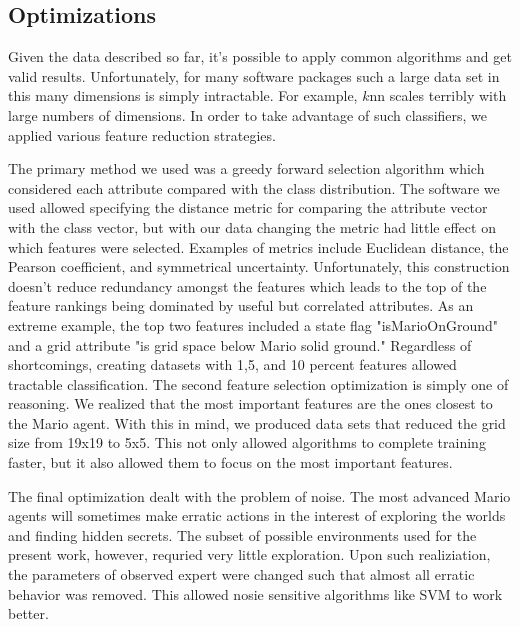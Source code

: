 \documentclass[]{article}   %
\begin{document}
\subsection{Optimizations}
Given the data described so far, it's possible to apply common algorithms and get valid results.  Unfortunately, for many software packages such a large data set in this many dimensions is simply intractable.  For example, $k$nn scales terribly with large numbers of dimensions.  In order to take advantage of such classifiers, we applied various feature reduction strategies.
\newline\newline

The primary method we used was a greedy forward selection algorithm which considered each attribute compared with the class distribution.  The software we used allowed specifying the distance metric for comparing the attribute vector with the class vector, but with our data changing the metric had little effect on which features were selected.  Examples of metrics include Euclidean distance, the Pearson coefficient, and symmetrical uncertainty.  Unfortunately, this construction doesn't reduce redundancy amongst the features which leads to the top of the feature rankings being dominated by useful but correlated attributes.  As an extreme example, the top two features included a state flag "isMarioOnGround" and a grid attribute "is grid space below Mario solid ground."  Regardless of shortcomings, creating datasets with 1,5, and 10 percent features allowed tractable classification.
\newline\newline
The second feature selection optimization is simply one of reasoning.  We realized that the most important features are the ones closest to the Mario agent.  With this in mind, we produced data sets that reduced the grid size from 19x19 to 5x5.  This not only allowed algorithms to complete training faster, but it also allowed them to focus on the most important features.
\newline\newline

The final optimization dealt with the problem of noise.  The most advanced Mario agents will sometimes make erratic actions in the interest of exploring the worlds and finding hidden secrets.  The subset of possible environments used for the present work, however, requried very little exploration.  Upon such realiziation, the parameters of observed expert were changed such that almost all erratic behavior was removed.  This allowed nosie sensitive algorithms like SVM to work better.
\end{document}
